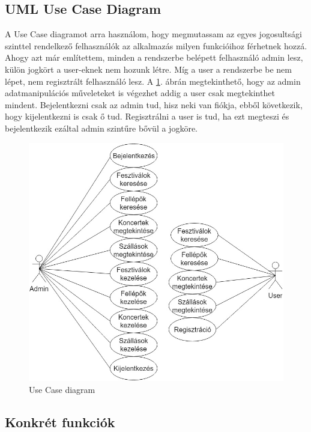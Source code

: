 \subsection{UML Use Case Diagram}
A Use Case diagramot arra használom, hogy megmutassam az egyes jogosultsági szinttel rendelkező felhasználók az alkalmazás milyen funkcióihoz férhetnek hozzá. Ahogy azt már említettem, minden a rendszerbe belépett felhasználó admin lesz, külön jogkört a user-eknek nem hozunk létre. Míg a user a rendszerbe be nem lépet, nem regisztrált felhasználó lesz. A \ref{fig:useCase}. ábrán megtekinthető, hogy az admin adatmanipulációs műveleteket is végezhet addig a user csak megtekinthet mindent. Bejelentkezni csak az admin tud, hisz neki van fiókja, ebből következik, hogy kijelentkezni is csak ő tud. Regisztrálni  a user is tud, ha ezt megteszi és bejelentkezik ezáltal admin szintűre bővül a jogköre.
\begin{figure}
\centering
\includegraphics[scale=0.6]{kepek/use_case.jpg}
\caption{Use Case diagram}
\label{fig:useCase}
\end{figure}

\subsection{Konkrét funkciók}

